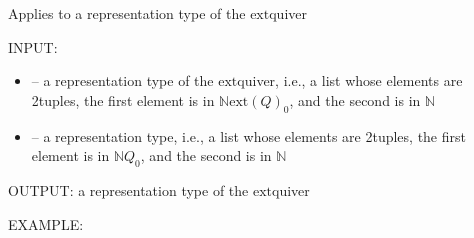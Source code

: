 \documentclass[letterpaper,10pt,english]{sphinxmanual}
\begin{document}

\begin{fulllineitems}
\label{\detokenize{index:quivercombinatorics.D_lifting}}
\pysigstartsignatures
\pysiglinewithargsret
{}
{\sphinxparamcomma {}}
{}
\pysigstopsignatures
\sphinxAtStartPar
Applies  to a representation type of the \(\mathrm{ext}\)\sphinxhyphen{}quiver

\sphinxAtStartPar
INPUT:
\begin{itemize}
\item {} 
\sphinxAtStartPar
{} – a representation type of the \(\mathrm{ext}\)\sphinxhyphen{}quiver, i.e., a list whose elements are 2\sphinxhyphen{}tuples, the first element is in \(\mathbb{N}\mathrm{ext}(Q)_0\), and the second is in \(\mathbb{N}\)

\item {} 
\sphinxAtStartPar
{} – a representation type, i.e., a list whose elements are 2\sphinxhyphen{}tuples, the first element is in \(\mathbb{N}Q_0\), and the second is in \(\mathbb{N}\)

\end{itemize}

\sphinxAtStartPar
OUTPUT: a representation type of the \(\mathrm{ext}\)\sphinxhyphen{}quiver

\sphinxAtStartPar
EXAMPLE:

\begin{sphinxVerbatim}[commandchars=\\\{\}]
  
   \PYG{p}{[}\PYG{p}{[}  \PYG{p}{]} \PYG{p}{[}  \PYG{p}{]} \PYG{p}{[}  \PYG{p}{]} \PYG{p}{[}  \PYG{p}{]}\PYG{p}{]}
 \PYG{p}{[}\PYG{p}{[}    \PYG{p}{]}\PYG{p}{]} 
\PYG{p}{[}\PYG{p}{[}  \PYG{p}{]}\PYG{p}{]}
\end{sphinxVerbatim}

\end{fulllineitems}
\end{document}
